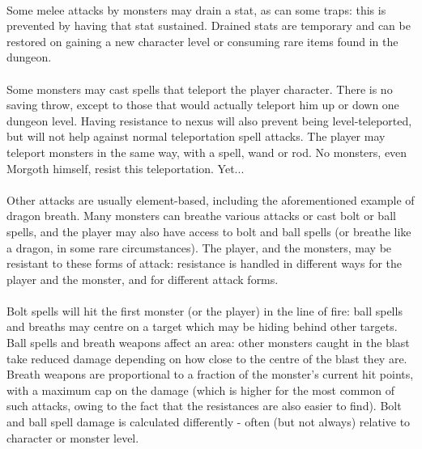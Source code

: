 \paragraph{}
Some melee attacks by monsters may drain a stat, as can some traps: this is
prevented by having that stat sustained. Drained stats are temporary and can
be restored on gaining a new character level or consuming rare items found
in the dungeon.

\paragraph{}
Some monsters may cast spells that teleport the player character. There is
no saving throw, except to those that would actually teleport him
up or down one dungeon level. Having resistance to nexus will also prevent
being level-teleported, but will not help against normal teleportation spell
attacks. The player may teleport monsters in the same way, with a spell,
wand or rod. No monsters, even Morgoth himself, resist this teleportation.
Yet...

\paragraph{}
Other attacks are usually element-based, including the aforementioned
example of dragon breath. Many monsters can breathe various attacks or
cast bolt or ball spells, and the player may also have access to bolt and
ball spells (or breathe like a dragon, in some rare circumstances). The
player, and the monsters, may be resistant to these forms of attack:
resistance is handled in different ways for the player and the monster,
and for different attack forms.

\paragraph{}
Bolt spells will hit the first monster (or the player) in the line of
fire: ball spells and breaths may centre on a target which may be hiding
behind other targets. Ball spells and breath weapons affect an area:
other monsters caught in the blast take reduced damage depending on how
close to the centre of the blast they are. Breath weapons are
proportional to a fraction of the monster's current hit points, with a
maximum cap on the damage (which is higher for the most common of such
attacks, owing to the fact that the resistances are also easier to
find). Bolt and ball spell damage is calculated differently - often (but
not always) relative to character or monster level.

